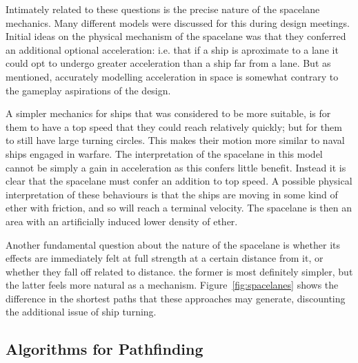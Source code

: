 Intimately related to these questions is the precise nature of the spacelane mechanics. Many different models were discussed for this during design meetings. Initial ideas on the physical mechanism of the spacelane was that they conferred an additional optional acceleration: i.e. that if a ship is aproximate to a lane it could opt to undergo greater acceleration than a ship far from a lane. But as mentioned, accurately modelling acceleration in space is somewhat contrary to the gameplay aspirations of the design. 

A simpler mechanics for ships that was considered to be more suitable, is for them to have a top speed that they could reach relatively quickly; but for them to still have large turning circles. This makes their motion more similar to naval ships engaged in warfare. The interpretation of the spacelane in this model cannot be simply a gain in acceleration as this confers little benefit. Instead it is clear that the spacelane must confer an addition to top speed. A possible physical interpretation of these behaviours is that the ships are moving in some kind of ether with friction, and so will reach a terminal velocity. The spacelane is then an area with an artificially induced lower density of ether.

Another fundamental question about the nature of the spacelane is whether its effects are immediately felt at full strength at a certain distance from it, or whether they fall off related to distance. the former is most definitely simpler, but the latter feels more natural as a mechanism. Figure~\ref{fig:spacelanes} shows the difference in the shortest paths that these approaches may generate, discounting the additional issue of ship turning.

\subsection{Algorithms for Pathfinding}

